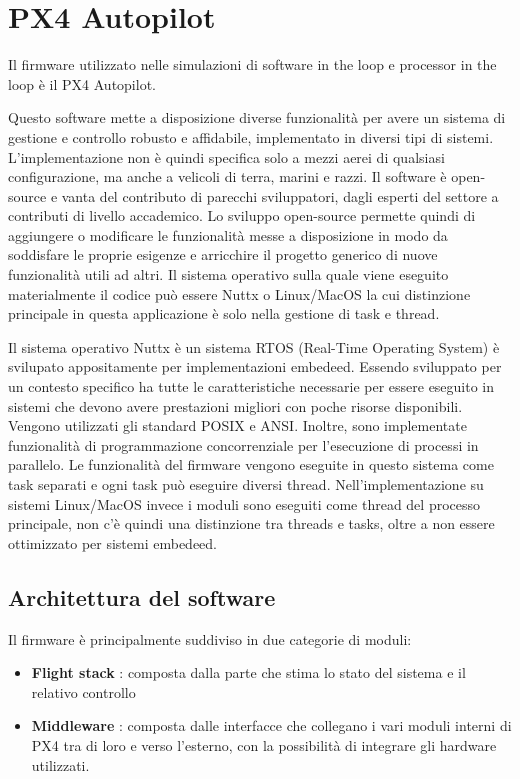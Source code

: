 \section{PX4 Autopilot}
Il firmware utilizzato nelle simulazioni di software in the loop e processor in the loop è il PX4 Autopilot.
	
Questo software mette a disposizione diverse funzionalità per avere un sistema di gestione e controllo robusto e affidabile, implementato in diversi tipi di sistemi. L'implementazione non è quindi specifica solo a mezzi aerei di qualsiasi configurazione, ma anche a velicoli di terra, marini e razzi. Il software è open-source e vanta del contributo di parecchi sviluppatori, dagli esperti del settore a contributi di livello accademico. Lo sviluppo open-source permette quindi di aggiungere o modificare le funzionalità messe a disposizione in modo da soddisfare le proprie esigenze e arricchire il progetto generico di nuove funzionalità utili ad altri. Il sistema operativo sulla quale viene eseguito materialmente il codice può essere Nuttx o Linux/MacOS la cui distinzione principale in questa applicazione è solo nella gestione di task e thread.

Il sistema operativo Nuttx è un sistema RTOS (Real-Time Operating System) è svilupato appositamente per implementazioni embedeed. Essendo sviluppato per un contesto specifico ha tutte le caratteristiche necessarie per essere eseguito in sistemi che devono avere prestazioni migliori con poche risorse disponibili. Vengono utilizzati gli standard POSIX e ANSI. Inoltre, sono implementate funzionalità di programmazione concorrenziale per l'esecuzione di processi in parallelo. Le funzionalità del firmware vengono eseguite in questo sistema come task separati e ogni task può eseguire diversi thread.
Nell'implementazione su sistemi Linux/MacOS invece i moduli sono eseguiti come thread del processo principale, non c'è quindi una distinzione tra threads e tasks, oltre a non essere ottimizzato per sistemi embedeed.


\subsection{Architettura del software}
Il firmware è principalmente suddiviso in due categorie di moduli:
\begin{itemize}
	\item \textbf{Flight stack} : composta dalla parte che stima lo stato del sistema e il relativo controllo
	\item \textbf{Middleware} : composta dalle interfacce che collegano i vari moduli interni di PX4 tra di loro e verso l'esterno, con la possibilità di integrare gli hardware utilizzati.
\end{itemize}


